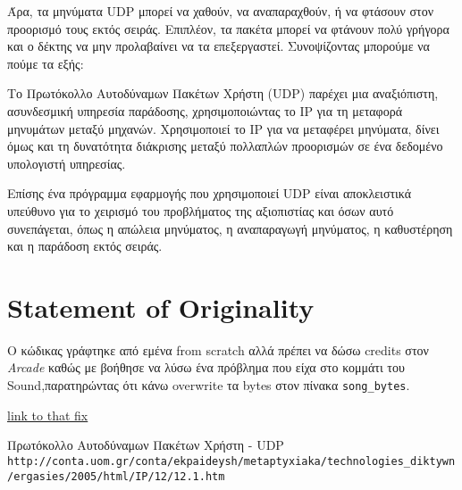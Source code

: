 \documentclass{article}
\begin{document}
Άρα, τα μηνύματα UDP μπορεί να χαθούν, να αναπαραχθούν, ή να φτάσουν στον
προορισμό τους εκτός σειράς. Επιπλέον, τα πακέτα μπορεί να φτάνουν πολύ γρήγορα
και ο δέκτης να μην προλαβαίνει να τα επεξεργαστεί. Συνοψίζοντας μπορούμε να
πούμε τα εξής:

Το Πρωτόκολλο Αυτοδύναμων Πακέτων Χρήστη (UDP) παρέχει μια αναξιόπιστη,
ασυνδεσμική υπηρεσία παράδοσης, χρησιμοποιώντας το ΙΡ για τη μεταφορά μηνυμάτων
μεταξύ μηχανών. Χρησιμοποιεί το ΙΡ για να μεταφέρει μηνύματα, δίνει όμως και τη
δυνατότητα διάκρισης μεταξύ πολλαπλών προορισμών σε ένα δεδομένο υπολογιστή
υπηρεσίας.

Επίσης ένα πρόγραμμα εφαρμογής που χρησιμοποιεί UDP είναι αποκλειστικά υπεύθυνο
για το χειρισμό του προβλήματος της αξιοπιστίας και όσων αυτό συνεπάγεται, όπως
η απώλεια μηνύματος, η αναπαραγωγή μηνύματος, η καθυστέρηση και η παράδοση εκτός
σειράς.

\section{Statement of Originality}

Ο κώδικας γράφτηκε από εμένα from scratch αλλά πρέπει να δώσω credits στον
{\emph{Arcade}} καθώς με βοήθησε να λύσω ένα πρόβλημα που είχα στο κομμάτι του
Sound,παρατηρώντας ότι κάνω overwrite τα bytes στον πίνακα \verb|song_bytes|.

\href{https://github.com/johnstef99/networks_2/commit/bc42b8c7da607addea5c8f30b90cf869de907ab0}{link to that fix}


\begin{thebibliography}{9}

Πρωτόκολλο Αυτοδύναμων Πακέτων Χρήστη - UDP
\\\texttt{http://conta.uom.gr/conta/ekpaideysh/metaptyxiaka/technologies\_diktywn
/ergasies/2005/html/IP/12/12.1.htm}
\end{thebibliography}
\end{document}
